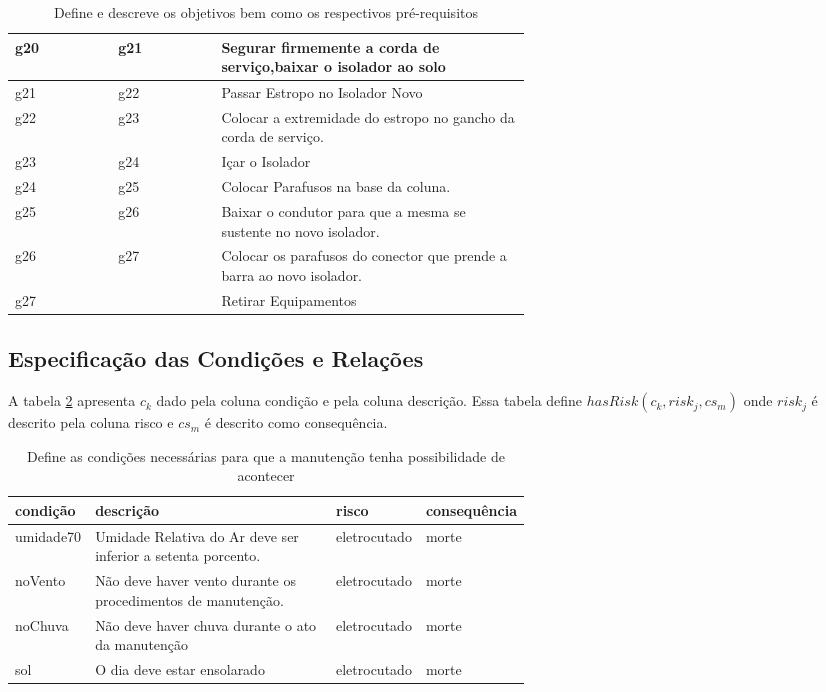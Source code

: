 \begin{table}[H]
\begin{tabular}{|l|l|p{0.6\linewidth}|}
g20 & g21 & Segurar firmemente a corda de serviço,baixar o isolador ao solo \\ \hline
g21 & g22 & Passar Estropo no Isolador Novo \\ \hline
g22 & g23 & Colocar a extremidade do estropo no gancho da corda de serviço. \\ \hline
g23 & g24 & Içar o Isolador \\ \hline
g24 & g25 & Colocar Parafusos na base da coluna. \\ \hline
g25 & g26 & Baixar o condutor para que a mesma se sustente no novo isolador. \\ \hline
g26 & g27 & Colocar os parafusos do conector que prende a barra ao novo isolador. \\ \hline
g27 &     & Retirar Equipamentos \\ \hline
\end{tabular}
\caption{Define e descreve os objetivos bem como os respectivos pré-requisitos}
\label{g}
\end{table}

\subsection{Especificação das Condições e Relações}

A tabela \ref{condition} apresenta $c_k$ dado pela coluna condição e pela coluna descrição. Essa tabela define $hasRisk(c_k,risk_j,cs_m)$ onde $risk_j$ é descrito pela coluna risco e $cs_m$ é descrito como consequência. 

\begin{table}[H]
\centering
\begin{tabular}{|l|p{0.6\linewidth}|l|l|}
\hline
\textbf{condição} & \textbf{descrição} & \textbf{risco} & \textbf{consequência} \\ \hline
umidade70 & Umidade Relativa do Ar deve ser inferior a setenta porcento. & eletrocutado & morte \\ \hline
noVento & Não deve haver vento durante os procedimentos de manutenção. & eletrocutado & morte \\ \hline
noChuva & Não deve haver chuva durante o ato da manutenção & eletrocutado & morte \\ \hline
sol & O dia deve estar ensolarado & eletrocutado & morte \\ \hline
\end{tabular}
\caption{Define as condições necessárias para que a manutenção tenha possibilidade de acontecer}
\label{condition}
\end{table}


